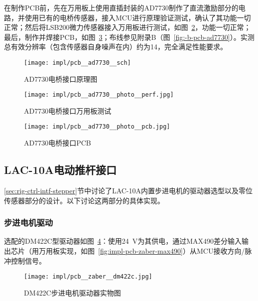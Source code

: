 在制作PCB前，先在万用板上使用直插封装的AD7730制作了直流激励部分的电路，并使用已有的电桥传感器，接入MCU进行原理验证测试，确认了其功能一切正常；然后将LSB200微力传感器接入万用板进行测试，如图~\ref{fig:impl-pcb-ad7730-photo-perf}，功能一切正常；最后，制作并焊接PCB，如图~\ref{fig:impl-pcb-ad7730-photo-pcb}；布线参见附录B（图~\ref{fig:-b-pcb-ad7730}）。实测总有效分辨率（包含传感器自身噪声在内）约为\SI{14}{\bit}，完全满足性能要求。

\begin{figure}[tbhp]
\centering
\texttt{[image: impl/pcb\_\_ad7730\_\_sch]}
\caption{AD7730电桥接口\csep 原理图}
\label{fig:impl-pcb-ad7730-sch}
\end{figure}

\begin{figure}[tbhp]
\centering
\texttt{[image: impl/pcb\_\_ad7730\_\_photo\_\_perf.jpg]}
\caption{AD7730电桥接口\csep 万用板测试}
\label{fig:impl-pcb-ad7730-photo-perf}
\end{figure}

\begin{figure}[tbhp]
\centering
\texttt{[image: impl/pcb\_\_ad7730\_\_photo\_\_pcb.jpg]}
\caption{AD7730电桥接口\csep PCB}
\label{fig:impl-pcb-ad7730-photo-pcb}
\end{figure}


\clearpage


\subsection{LAC-10A电动推杆接口}\label{sec:impl-pcb-zaber}

\ref{sec:rig-ctrl-intf-stepper}节中讨论了LAC-10A内置步进电机的驱动器选型以及零位传感器部分的设计。以下讨论这两部分的具体实现。

\subsubsection{步进电机驱动}\label{sec:impl-pcb-zaber-stepper}

选配的DM422C型驱动器如图~\ref{fig:impl-pcb-zaber-dm422c}：使用\SI{+24}{\V}为其供电，通过MAX490差分输入输出芯片（用万用板实现，如图~\ref{fig:impl-pcb-zaber-max490}）从MCU接收方向/脉冲控制信号。

\begin{figure}[tbh]
\centering
\texttt{[image: impl/pcb\_\_zaber\_\_dm422c.jpg]}
\caption{DM422C步进电机驱动器实物图}
\label{fig:impl-pcb-zaber-dm422c}
\end{figure}

